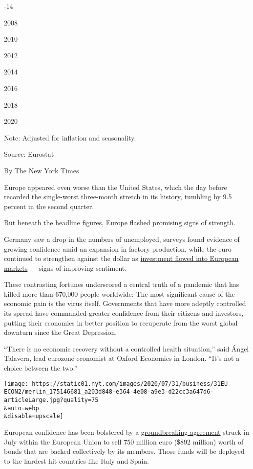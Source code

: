 -14

2008

2010

2012

2014

2016

2018

2020

Note: Adjusted for inflation and seasonality.

Source: Eurostat

By The New York Times

Europe appeared even worse than the United States, which the day before
\href{https://www.nytimes.com/2020/07/30/business/economy/q2-gdp-coronavirus-economy.html?action=click\&module=Top\%20Stories\&pgtype=Homepage}{recorded
the single-worst} three-month stretch in its history, tumbling by 9.5
percent in the second quarter.

But beneath the headline figures, Europe flashed promising signs of
strength.

Germany saw a drop in the numbers of unemployed, surveys found evidence
of growing confidence amid an expansion in factory production, while the
euro continued to strengthen against the dollar as
\href{https://www.nytimes.com/2020/07/30/business/europes-markets-are-having-a-moment.html}{investment
flowed into European markets} --- signs of improving sentiment.

These contrasting fortunes underscored a central truth of a pandemic
that has killed more than 670,000 people worldwide: The most significant
cause of the economic pain is the virus itself. Governments that have
more adeptly controlled its spread have commanded greater confidence
from their citizens and investors, putting their economies in better
position to recuperate from the worst global downturn since the Great
Depression.

``There is no economic recovery without a controlled health situation,''
said Ángel Talavera, lead eurozone economist at Oxford Economics in
London. ``It's not a choice between the two.''

\texttt{[image: https://static01.nyt.com/images/2020/07/31/business/31EU-ECON2/merlin\_175146681\_a203d848-e364-4e08-a9e3-d22cc3a647d6-articleLarge.jpg?quality=75\\\&auto=webp\\\&disable=upscale]}

European confidence has been bolstered by a
\href{https://www.nytimes.com/2020/07/20/world/europe/eu-stimulus-coronavirus.html}{groundbreaking
agreement} struck in July within the European Union to sell 750 million
euro (\$892 million) worth of bonds that are backed collectively by its
members. Those funds will be deployed to the hardest hit countries like
Italy and Spain.

